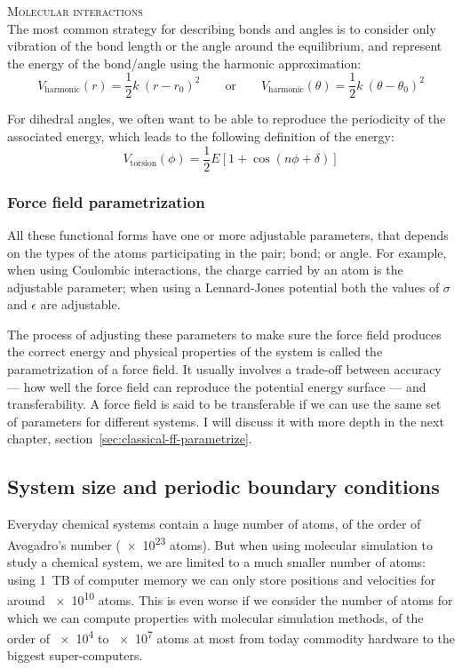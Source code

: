 \documentclass[thesis]{subfiles}
\begin{document}
\textsc{Molecular interactions}\\[0.1\baselineskip]
The most common strategy for describing bonds and angles is to consider only
vibration of the bond length or the angle around the equilibrium, and represent
the energy of the bond/angle using the harmonic approximation:
\[V_\text{harmonic}(r) = \frac 12 k \ (r - r_0)^2 \qquad\text{or}\qquad V_\text{harmonic}(\theta) = \frac 12 k \ (\theta - \theta_0)^2 \]

For dihedral angles, we often want to be able to reproduce the periodicity of
the associated energy, which leads to the following definition of the energy:
\[V_\text{torsion}(\phi) = \frac 12 E \left[1 + \cos(n \phi + \delta)\right] \]

\subsubsection{Force field parametrization}

All these functional forms have one or more adjustable parameters, that depends
on the types of the atoms participating in the pair; bond; or angle. For
example, when using Coulombic interactions, the charge carried by an atom is the
adjustable parameter; when using a Lennard-Jones potential both the values of
$\sigma$ and $\epsilon$ are adjustable.

The process of adjusting these parameters to make sure the force field produces
the correct energy and physical properties of the system is called the
parametrization of a force field. It usually involves a trade-off between
accuracy --- \ie how well the force field can reproduce the potential energy
surface --- and transferability. A force field is said to be transferable if we
can use the same set of parameters for different systems. I will discuss it with
more depth in the next chapter, section~\ref{sec:classical-ff-parametrize}.

\subsection{System size and periodic boundary conditions}
\label{sec:pbc}

Everyday chemical systems contain a huge number of atoms, of the order of
Avogadro's number (\SI{e23}{} atoms). But when using molecular simulation to
study a chemical system, we are limited to a much smaller number of atoms: using
\SI{1}{TB} of computer memory we can only store positions and velocities for
around \SI{e10}{} atoms. This is even worse if we consider the number of atoms
for which we can compute properties with molecular simulation methods, of the
order of \SI{e4}{} to \SI{e7}{} atoms at most from today commodity hardware to
the biggest super-computers.
\end{document}
